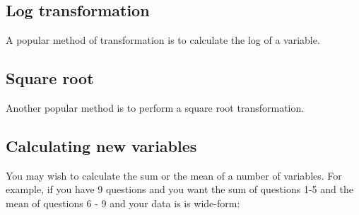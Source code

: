 \documentclass[]{book}
\newenvironment{Shaded}{\begin{snugshade}}{\end{snugshade}}
\newcommand{\DataTypeTok}[1]{\textcolor[rgb]{0.13,0.29,0.53}{#1}}
\newcommand{\KeywordTok}[1]{\textcolor[rgb]{0.13,0.29,0.53}{\textbf{#1}}}
\newcommand{\NormalTok}[1]{#1}
\newcommand{\OperatorTok}[1]{\textcolor[rgb]{0.81,0.36,0.00}{\textbf{#1}}}
\newcommand{\StringTok}[1]{\textcolor[rgb]{0.31,0.60,0.02}{#1}}
\begin{document}
\hypertarget{log-transformation}{%
\subsection{Log transformation}\label{log-transformation}}

A popular method of transformation is to calculate the log of a variable.

\begin{Shaded}
\end{Shaded}

\hypertarget{square-root}{%
\subsection{Square root}\label{square-root}}

Another popular method is to perform a square root transformation.

\begin{Shaded}
\end{Shaded}

\hypertarget{calculating-new-variables}{%
\subsection{Calculating new variables}\label{calculating-new-variables}}

You may wish to calculate the sum or the mean of a number of variables. For example, if you have 9 questions and you want the sum of questions 1-5 and the mean of questions 6 - 9 and your data is is wide-form:

\begin{Shaded}
\end{Shaded}
\end{document}
